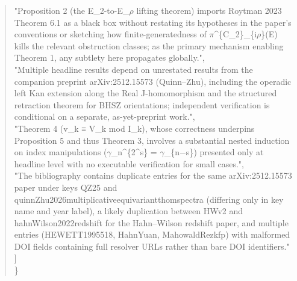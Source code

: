 \documentclass[11pt]{article}
\begin{document}
\begin{quote}
    "Proposition 2 (the E\_2-to-E\_\ensuremath{\rho} lifting theorem) imports Roytman 2023 Theorem 6.1 as a black box without restating its hypotheses in the paper's conventions or sketching how finite-generatedness of \ensuremath{\pi}\^{}\{C\_2\}\_\{i\ensuremath{\rho}\}(E) kills the relevant obstruction classes; as the primary mechanism enabling Theorem 1, any subtlety here propagates globally.",\\
    "Multiple headline results depend on unrestated results from the companion preprint arXiv:2512.15573 (Quinn--Zhu), including the operadic left Kan extension along the Real J-homomorphism and the structured retraction theorem for BHSZ orientations; independent verification is conditional on a separate, as-yet-preprint work.",\\
    "Theorem 4 (v\_k ≡ V\_k mod I\_k), whose correctness underpins Proposition 5 and thus Theorem 3, involves a substantial nested induction on index manipulations (\ensuremath{\gamma}\_n\^{}\{2\^{}s\} = \ensuremath{\gamma}\_\{n\ensuremath{-}s\}) presented only at headline level with no executable verification for small cases.",\\
    "The bibliography contains duplicate entries for the same arXiv:2512.15573 paper under keys QZ25 and quinnZhu2026multiplicativeequivariantthomspectra (differing only in key name and year label), a likely duplication between HWv2 and hahnWilson2022redshift for the Hahn--Wilson redshift paper, and multiple entries (HEWETT1995518, HahnYuan, MahowaldRezkfp) with malformed DOI fields containing full resolver URLs rather than bare DOI identifiers."\\
  ]\\
\}\\
\end{quote}
\end{document}
